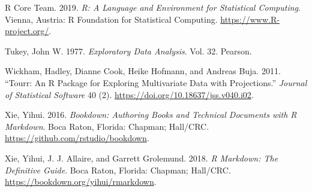 \documentclass[11,]{article}
\begin{document}
\leavevmode\hypertarget{ref-r_core_team_r:_2019}{}%
R Core Team. 2019. \emph{R: A Language and Environment for Statistical Computing}. Vienna, Austria: R Foundation for Statistical Computing. \url{https://www.R-project.org/}.

\leavevmode\hypertarget{ref-tukey_exploratory_1977}{}%
Tukey, John W. 1977. \emph{Exploratory Data Analysis}. Vol. 32. Pearson.

\leavevmode\hypertarget{ref-wickham_tourr:_2011}{}%
Wickham, Hadley, Dianne Cook, Heike Hofmann, and Andreas Buja. 2011. ``Tourr: An R Package for Exploring Multivariate Data with Projections.'' \emph{Journal of Statistical Software} 40 (2). \url{https://doi.org/10.18637/jss.v040.i02}.

\leavevmode\hypertarget{ref-xie_bookdown:_2016}{}%
Xie, Yihui. 2016. \emph{Bookdown: Authoring Books and Technical Documents with R Markdown}. Boca Raton, Florida: Chapman; Hall/CRC. \url{https://github.com/rstudio/bookdown}.

\leavevmode\hypertarget{ref-xie_r_2018}{}%
Xie, Yihui, J. J. Allaire, and Garrett Grolemund. 2018. \emph{R Markdown: The Definitive Guide}. Boca Raton, Florida: Chapman; Hall/CRC. \url{https://bookdown.org/yihui/rmarkdown}.
\end{document}
